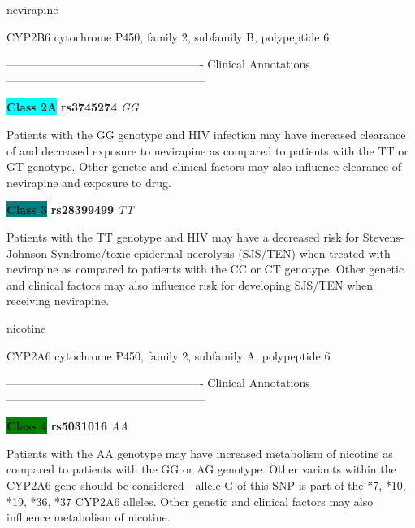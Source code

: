 \documentclass{resume} %
\begin{document}
\begin{rSection}{ nevirapine }
\begin{rSubsection}{ CYP2B6 }{ cytochrome P450, family 2, subfamily B, polypeptide 6 }{}{}
\item[]

\item[] ---------------------------------------------------- Clinical Annotations -----------------------------------------------------\newline
\item \textbf{\colorbox{cyan} {Class 2A}} \textbf{ rs3745274 } \textit{ GG }
\item[] Patients with the GG genotype and HIV infection may have increased clearance of and decreased exposure to nevirapine as compared to patients with the TT or GT genotype. Other genetic and clinical factors may also influence clearance of nevirapine and exposure to drug.\item \textbf{\colorbox{teal} {Class 3}} \textbf{ rs28399499 } \textit{ TT }
\item[] Patients with the TT genotype and HIV may have a decreased risk for Stevens-Johnson Syndrome/toxic epidermal necrolysis (SJS/TEN) when treated with nevirapine as compared to patients with the CC or CT genotype. Other genetic and clinical factors may also influence risk for developing SJS/TEN when receiving nevirapine.
\end{rSubsection}

\end{rSection}\begin{rSection}{ nicotine }
\item[]

\begin{rSubsection}{ CYP2A6 }{ cytochrome P450, family 2, subfamily A, polypeptide 6 }{}{}
\item[]

\item[] ---------------------------------------------------- Clinical Annotations -----------------------------------------------------\newline
\item \textbf{\colorbox{green} {Class 4}} \textbf{ rs5031016 } \textit{ AA }
\item[] Patients with the AA genotype may have increased metabolism of nicotine as compared to patients with the GG or AG genotype. Other variants within the CYP2A6 gene should be considered - allele G of this SNP is part of the *7, *10, *19, *36, *37 CYP2A6 alleles. Other genetic and clinical factors may also influence metabolism of nicotine.
\end{rSubsection}


\end{rSection}
\end{document}
